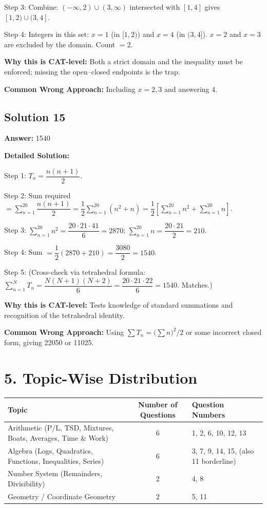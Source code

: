 \documentclass[11pt]{article}
\begin{document}
Step 3: Combine: \((-\infty,2)\cup(3,\infty)\) intersected with \([1,4]\) gives \([1,2) \cup (3,4]\).

Step 4: Integers in this set: \(x = 1\) (in \([1,2)\)) and \(x = 4\) (in \((3,4]\)). \(x=2\) and \(x=3\) are excluded by the domain. Count \(= 2\).

\textbf{Why this is CAT-level:} Both a strict domain and the inequality must be enforced; missing the open–closed endpoints is the trap.

\textbf{Common Wrong Approach:} Including \(x = 2, 3\) and answering 4.

\subsection*{Solution 15}
\textbf{Answer:} 1540

\textbf{Detailed Solution:}

Step 1: \(T_n = \dfrac{n(n+1)}{2}\).

Step 2: Sum required \(= \displaystyle\sum_{n=1}^{20} \dfrac{n(n+1)}{2} = \dfrac{1}{2}\sum_{n=1}^{20}(n^{2}+n) = \dfrac{1}{2}\!\left[\sum_{n=1}^{20} n^{2} + \sum_{n=1}^{20} n\right]\).

Step 3: \(\displaystyle\sum_{n=1}^{20} n^{2} = \dfrac{20 \cdot 21 \cdot 41}{6} = 2870\); \quad \(\displaystyle\sum_{n=1}^{20} n = \dfrac{20 \cdot 21}{2} = 210\).

Step 4: Sum \(= \dfrac{1}{2}(2870 + 210) = \dfrac{3080}{2} = 1540\).

Step 5: (Cross-check via tetrahedral formula: \(\sum_{n=1}^{N} T_n = \dfrac{N(N+1)(N+2)}{6} = \dfrac{20 \cdot 21 \cdot 22}{6} = 1540\). Matches.)

\textbf{Why this is CAT-level:} Tests knowledge of standard summations and recognition of the tetrahedral identity.

\textbf{Common Wrong Approach:} Using \(\sum T_n = \big(\sum n\big)^{2}/2\) or some incorrect closed form, giving 22050 or 11025.

\newpage
\section*{5. Topic-Wise Distribution}

\begin{longtable}{|l|c|l|}
\hline
\textbf{Topic} & \textbf{Number of Questions} & \textbf{Question Numbers} \\ \hline
Arithmetic (P/L, TSD, Mixtures, Boats, Averages, Time \& Work) & 6 & 1, 2, 6, 10, 12, 13 \\ \hline
Algebra (Logs, Quadratics, Functions, Inequalities, Series) & 6 & 3, 7, 9, 14, 15, (also 11 borderline) \\ \hline
Number System (Remainders, Divisibility) & 2 & 4, 8 \\ \hline
Geometry / Coordinate Geometry & 2 & 5, 11 \\ \hline
\end{longtable}
\end{document}
